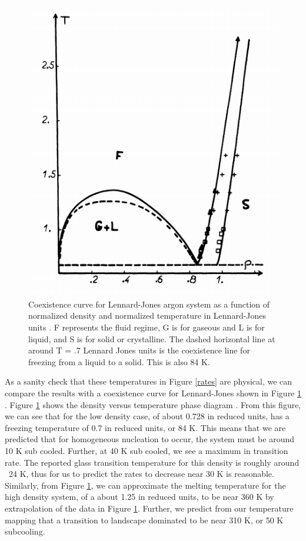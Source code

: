 \begin{figure}[h]
	\centering
	\includegraphics[width=.45\textwidth]{./Figures/Nucleation/LJ_phase_density.png}
	\caption[Coexistence curve for Lennard-Jones argon system as a function of normalized density and normalized temperature in Lennard-Jones units. F represents the fluid regime, G is for gaseous and L is for liquid, and S is for solid or crystalline.  The dashed horizontal line at around T = .7 Lennard Jones units is the coexistence line for freezing from a liquid to a solid.  This is also 84 K.]{Coexistence curve for Lennard-Jones argon system as a function of normalized density and normalized temperature in Lennard-Jones units \cite{Hansen1969}. F represents the fluid regime, G is for gaseous and L is for liquid, and S is for solid or crystalline.  The dashed horizontal line at around T = .7 Lennard Jones units is the coexistence line for freezing from a liquid to a solid.  This is also 84 K. \cite{Hansen1969}}
	\label{LJ_phase_density}
\end{figure}

As a sanity check that these temperatures in Figure \ref{rates} are physical, we can compare the results with a coexistence curve for Lennard-Jones shown in Figure \ref{LJ_phase_density} \cite{Hansen1969}.  Figure \ref{LJ_phase_density} shows the density versus temperature phase diagram \cite{Hansen1969}.  From this figure, we can see that for the low density case, of about 0.728 in reduced units, has a freezing temperature of 0.7 in reduced units, or 84 K.  This means that we are predicted that for homogeneous nucleation to occur, the system must be around 10 K sub cooled.  Further, at 40 K sub cooled, we see a maximum in transition rate.  The reported glass transition temperature for this density is roughly around ~24 K, thus for us to predict the rates to decrease near 30 K is reasonable.  Similarly, from Figure \ref{LJ_phase_density}, we can approximate the melting temperature for the high density system, of a about 1.25 in reduced units, to be near 360 K by extrapolation of the data in Figure \ref{LJ_phase_density}.  Further, we predict from our temperature mapping that a transition to landscape dominated to be near 310 K, or 50 K subcooling.  

